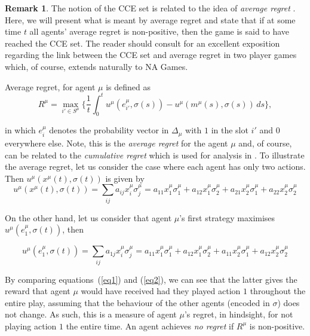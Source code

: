 \documentclass{article}
\theoremstyle{definition}
\newtheorem*{remark}{Remark}
\newcommand{\pure}[2]{e^{#1}_{#2}}
\begin{document}
  \begin{remark} \label{rem::regretvsCCE}
    The notion of the CCE set is related to the idea of \emph{average regret}  \cite{Nisan2007}. Here, we
    will present what is meant by average regret and state that if at some time $t$ all agents'
    average regret is non-positive, then the game is said to have reached the CCE set. The
    reader should consult \cite{Ostrovski2014} for an excellent exposition regarding the
    link between the CCE set and average regret in two player games which, of course, extends
    naturally to NA Games.
    
    Average regret, for agent $\mu$ is defined as
%
    \begin{equation*}
      R^{\mu} = \max_{i' \in S^\mu} \Big\{ \frac{1}{t} \int_{0}^{t} u^{\mu}(\pure{\mu}{i'}, \sigma(s)) - u^{\mu}(m^\mu(s), \sigma(s)) \, ds \Big\},
    \end{equation*}
  
    in which $\pure{\mu}{i}$ denotes the probability vector in $\Delta_\mu$ with $1$ in the slot
    $i'$ and $0$ everywhere else. Note, this is the \emph{average regret} for the agent $\mu$
    and, of course, can be related to the \emph{cumulative regret} which is used for analysis
    in \cite{Leonardos2020, Cesa-Bianchi2021}.  To illustrate the average regret, let us
    consider the case where each agent has only two actions. Then $u^{\mu}(x^\mu(t), \sigma(t))$
    is given by
%    
    \begin{equation} \label{eq1}
      u^{\mu}(x^\mu(t), \sigma(t)) = \sum_{ij} a_{ij} x_i^\mu \sigma_j^\mu = a_{11} x_1^\mu \sigma_1^\mu + a_{12} x_1^\mu \sigma_2^\mu + a_{21} x_2^\mu \sigma_1^\mu + a_{22} x_2^\mu \sigma_2^\mu
    \end{equation}
  
    On the other hand, let us consider that agent $\mu$'s first strategy maximises $u^{\mu}(\pure{\mu}{1}, \sigma(t))$, then
  
    \begin{equation}  \label{eq2}
      u^{\mu}(\pure{\mu}{1}, \sigma(t)) = \sum_{ij} a_{1j} x_i^\mu \sigma_j^\mu = a_{11} x_1^\mu \sigma_1^\mu + a_{12} x_1^\mu \sigma_2^\mu + a_{11} x_2^\mu \sigma_1^\mu + a_{12} x_2^\mu \sigma_2^\mu 
    \end{equation}
  
    By comparing equations~(\ref{eq1}) and (\ref{eq2}),
    we can see that the latter gives the reward that agent $\mu$ would have received had they played action $1$ throughout the entire play, assuming that the behaviour of the other agents (encoded in $\sigma$) does not change. As such, this is a measure of agent $\mu$'s regret, in hindsight, for not playing action $1$ the entire time. An agent achieves \emph{no regret} if $R^\mu$ is non-positive.
  \end{remark}
\end{document}
